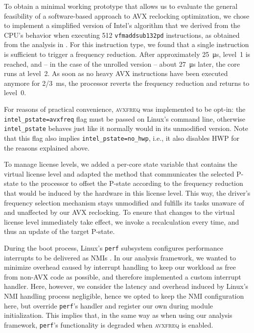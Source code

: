 To obtain a minimal working prototype that allows us to evaluate the general feasibility of a software-based approach to \gls{AVX} reclocking optimization, we chose to implement a simplified version of Intel's algorithm that we derived from the \gls{CPU}'s behavior when executing \SI[number-unit-product=-]{512}{\bit} \texttt{vfmaddsub132pd} instructions, as obtained from the analysis in . For this instruction type, we found that a single instruction is sufficient to trigger a frequency reduction. After  approximately \SI{25}{\micro\second}, level~1 is reached, and -- in the case of the unrolled version -- about \SI{27}{\micro\second} later, the core runs at level~2. As soon as no heavy \gls{AVX} instructions have been executed anymore for \SI[quotient-mode=fraction]{2/3}{\milli\second}, the processor reverts the frequency reduction and returns to level~0. %

For reasons of practical convenience, \textsc{avxfreq} was implemented to be opt-in: the \texttt{intel\_pstate=avxfreq} flag must be passed on \gls{Linux}'s command line, otherwise \texttt{intel\_pstate} behaves just like it normally would in its unmodified version. Note that this flag also implies \texttt{intel\_pstate=no\_hwp}, i.e., it also disables \gls{HWP} for the reasons explained above.

To manage license levels, we added a per-core state variable that contains the virtual license level and adapted the method that communicates the selected \gls{P-state} to the processor to offset the \gls{P-state} according to the frequency reduction that would be induced by the hardware in this license level. This way, the driver's frequency selection mechanism stays unmodified and fulfills its tasks unaware of and unaffected by our \gls{AVX} reclocking. To ensure that changes to the virtual license level immediately take effect, we invoke a recalculation every time, and thus an update of the target \gls{P-state}.

During the boot process, \gls{Linux}'s \texttt{perf} subsystem configures performance interrupts to be delivered as \glspl{NMI} \cite{kernelx86eventscore}. In our analysis framework, we wanted to minimize overhead caused by interrupt handling to keep our workload as free from non-\gls{AVX} code as possible, and therefore implemented a custom interrupt handler. Here, however, we consider the latency and overhead induced by Linux's \gls{NMI} handling process negligible, hence we opted to keep the \gls{NMI} configuration here, but override \texttt{perf}'s handler and register our own during module initialization. This implies that, in the same way as when using our analysis framework, \texttt{perf}'s functionality is degraded when \textsc{avxfreq} is enabled.

